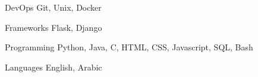 

\begin{cvskills}


  \cvskill
    {DevOps} %
    {Git, Unix, Docker} %

  \cvskill
    {Frameworks} %
    {Flask, Django} %

  \cvskill
    {Programming} %
    {Python, Java, C, HTML, CSS, Javascript, SQL, Bash} %

  \cvskill
    {Languages} %
    {English, Arabic} %

\end{cvskills}
